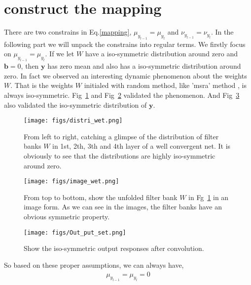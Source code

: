 \documentclass[]{article}
\begin{document}
\section{construct the mapping}
There are two constrains in Eq.\ref{mapping}, $\mu_{y_{l-1}}=\mu_{y_{l}}$ and $\nu_{y_{l-1}}=\nu_{y_{l}}$. In the following part we will unpack the constrains into regular terms. We firstly focus on $\mu_{y_{l-1}}=\mu_{y_{l}}$. If we let $W$ have a iso-symmetric distribution around zero and $\mathbf{b}=0$, then $\mathbf{y}$ has zero mean and also has a iso-symmetric distribution around zero. In fact we observed an interesting dynamic phenomenon about the weights $W$. That is the weights $W$ initialed with random method, like 'msra' method , is always iso-symmetric. Fig~\ref{distri_wet} and Fig~\ref{image_wet} validated the phenomenon. And Fig~\ref{Out_put_set} also validated the iso-symmetric distribution of $\mathbf{y}$.
\begin{figure}
  \centering
  \texttt{[image: figs/distri\_wet.png]}\\
  \caption{From left to right, catching a glimpse of the distribution of filter banks $W$ in 1st, 2th, 3th and 4th layer of a well convergent net. It is obviously to see that the distributions are highly iso-symmetric around zero.}\label{distri_wet}
\end{figure}

\begin{figure}
  \centering
  \texttt{[image: figs/image\_wet.png]}\\
  \caption{From top to bottom, show the unfolded filter bank $W$ in Fg~\ref{distri_wet} in an image form. As we can see in the images, the filter banks have an obvious symmetric property.}\label{image_wet}
\end{figure}

\begin{figure}
  \centering
  \texttt{[image: figs/Out\_put\_set.png]}\\
  \caption{Show the iso-symmetric output responses after convolution. }\label{Out_put_set}
\end{figure}

So based on these proper assumptions, we can always have,
\begin{align}\label{constrain1}
\mu_{y_{l-1}}=\mu_{y_{l}}=0
\end{align}
\end{document}
